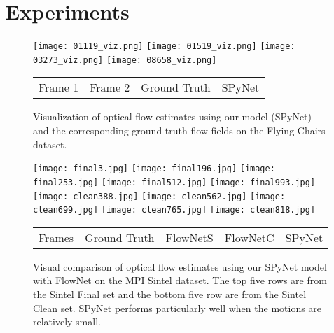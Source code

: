 \documentclass[10pt,twocolumn,letterpaper]{article}
\begin{document}
\section{Experiments}
\begin{figure}[t]
\begin{center}
\texttt{[image: 01119\_viz.png]}
\texttt{[image: 01519\_viz.png]}
\texttt{[image: 03273\_viz.png]}
\texttt{[image: 08658\_viz.png]}
\begin{tabular}{C{0.08\textwidth}C{0.09\textwidth}C{0.14\textwidth}C{0.07\textwidth}}
Frame 1 & Frame 2 & Ground Truth & SPyNet \\
 \end{tabular}
\end{center}
\vspace{-0.1in}
   \caption{Visualization of optical flow estimates using our model (SPyNet) and the corresponding ground truth flow fields on the Flying Chairs dataset.}
\label{fig:chairsresults}
\end{figure}


\begin{figure*}
\begin{center}
\texttt{[image: final3.jpg]}
\texttt{[image: final196.jpg]}
\texttt{[image: final253.jpg]}
\texttt{[image: final512.jpg]}
\texttt{[image: final993.jpg]}
\texttt{[image: clean388.jpg]}
\texttt{[image: clean562.jpg]}
\texttt{[image: clean699.jpg]}
\texttt{[image: clean765.jpg]}
\texttt{[image: clean818.jpg]}
\begin{tabular}{C{0.2\textwidth}C{0.16\textwidth}C{0.16\textwidth}C{0.16\textwidth}C{0.2\textwidth}}
Frames & Ground Truth & FlowNetS & FlowNetC & SPyNet \\
 \end{tabular}
\end{center}
\vspace{-0.1in}
\caption{Visual comparison of optical flow estimates using our  SPyNet model with FlowNet on the MPI Sintel dataset. The top five rows are from the  Sintel Final set and the bottom five row are from the Sintel Clean set.
SPyNet performs particularly well when the motions are relatively small.
}
\label{fig:sintelresults}
\end{figure*}
\end{document}
